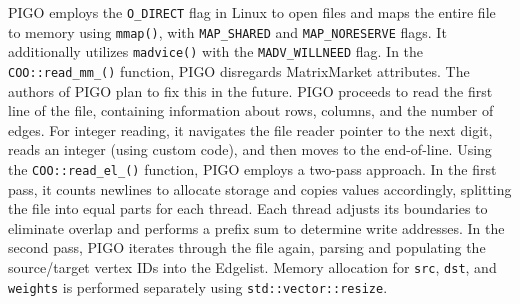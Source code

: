 PIGO employs the \texttt{O\_DIRECT} flag in Linux to open files and maps the entire file to memory using \texttt{mmap()}, with \texttt{MAP\_SHARED} and \texttt{MAP\_NORESERVE} flags. It additionally utilizes \texttt{madvice()} with the \texttt{MADV\_WILLNEED} flag. In the \texttt{COO::read\_mm\_()} function, PIGO disregards MatrixMarket attributes. The authors of PIGO plan to fix this in the future. PIGO proceeds to read the first line of the file, containing information about rows, columns, and the number of edges. For integer reading, it navigates the file reader pointer to the next digit, reads an integer (using custom code), and then moves to the end-of-line. Using the \texttt{COO::read\_el\_()} function, PIGO employs a two-pass approach. In the first pass, it counts newlines to allocate storage and copies values accordingly, splitting the file into equal parts for each thread. Each thread adjusts its boundaries to eliminate overlap and performs a prefix sum to determine write addresses. In the second pass, PIGO iterates through the file again, parsing and populating the source/target vertex IDs into the Edgelist. Memory allocation for \texttt{src}, \texttt{dst}, and \texttt{weights} is performed separately using \texttt{std::vector::resize}.


